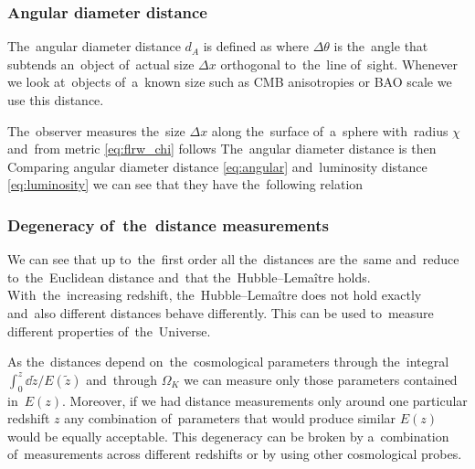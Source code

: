 \subsubsection{Angular diameter distance}
The~angular diameter distance $d_A$ is defined as \DIFaddbegin \parencite{2010deto.book.....A}
\DIFaddend {}
where $\Delta\theta$ is the~angle that subtends an~object of~actual size $\Delta x$ orthogonal to~the~line of~sight. Whenever we look at~objects of~a~known size such as CMB anisotropies or BAO scale we use this distance.

The~observer measures the~size $\Delta x$ along the~surface of~a~sphere with~radius $\chi$ and~from metric \eqref{eq:flrw_chi} follows
The~angular diameter distance is then
Comparing angular diameter distance \eqref{eq:angular} and~luminosity distance \eqref{eq:luminosity} we can see that they have the~following relation
\subsubsection{Degeneracy of~the~distance measurements}
We can see that up to~the~first order all the~distances are the~same and~reduce to~the~Euclidean distance and~that the~Hubble--Lema\^{i}tre holds. With~the~increasing redshift, the~Hubble--Lema\^{i}tre does not hold exactly and~also different distances behave differently. This can be used to~measure different properties of~the~Universe.

As the~distances depend on~the~cosmological parameters through the~integral $\int_0^z{\dd\tilde z/E(\tilde z)}$ and~through $\Omega_K$ we can measure only those parameters contained in~$E(z)$. Moreover, if we had distance measurements only around one particular redshift $z$ any combination of~parameters that would produce similar $E(z)$ would be equally acceptable. This degeneracy can be broken by a~combination of~measurements across different redshifts or by using other cosmological probes. 
